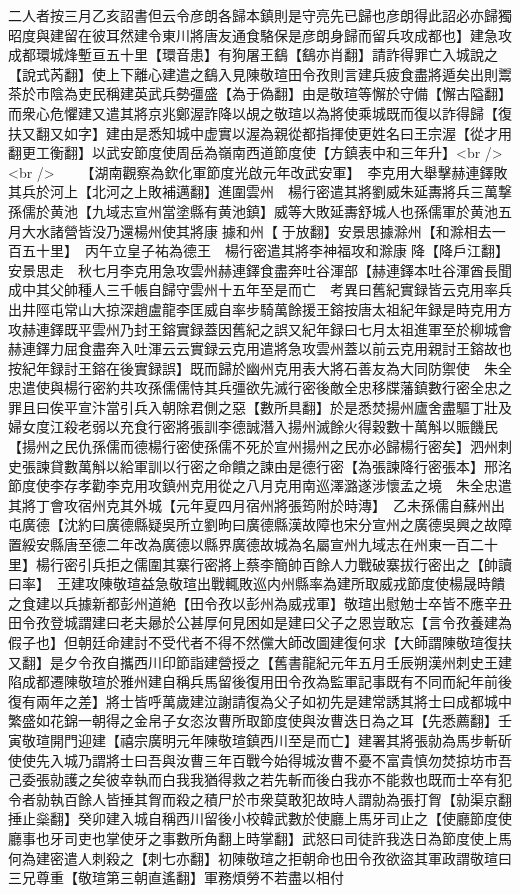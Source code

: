 二人者按三月乙亥詔書但云令彦朗各歸本鎮則是守亮先已歸也彦朗得此詔必亦歸獨昭度與建留在彼耳然建令東川將唐友通食駱保是彦朗身歸而留兵攻成都也】建急攻成都環城烽塹亘五十里【環音患】有狗屠王鷂【鷂亦肖翻】請詐得罪亡入城說之【說式芮翻】使上下離心建遣之鷂入見陳敬瑄田令孜則言建兵疲食盡將遁矣出則鬻茶於市陰為吏民稱建英武兵勢彊盛【為于偽翻】由是敬瑄等懈於守備【懈古隘翻】而衆心危懼建又遣其將京兆鄭渥詐降以覘之敬瑄以為將使乘城既而復以詐得歸【復扶又翻又如字】建由是悉知城中虚實以渥為親從都指揮使更姓名曰王宗渥【從才用翻更工衡翻】以武安節度使周岳為嶺南西道節度使【方鎮表中和三年升】<br />
<br />
　　【湖南觀察為欽化軍節度光啟元年改武安軍】　李克用大舉擊赫連鐸敗其兵於河上【北河之上敗補邁翻】進圍雲州　楊行密遣其將劉威朱延夀將兵三萬撃孫儒於黄池【九域志宣州當塗縣有黄池鎮】威等大敗延夀舒城人也孫儒軍於黄池五月大水諸營皆没乃還楊州使其將康據和州【于放翻】安景思據滁州【和滁相去一百五十里】　丙午立皇子祐為德王　楊行密遣其將李神福攻和滁康降【降戶江翻】安景思走　秋七月李克用急攻雲州赫連鐸食盡奔吐谷渾部【赫連鐸本吐谷渾酋長聞成中其父帥種人三千帳自歸守雲州十五年至是而亡　考異曰舊紀實録皆云克用率兵出井陘屯常山大掠深趙盧龍李匡威自率步騎萬餘援王鎔按唐太祖紀年録是時克用方攻赫連鐸既平雲州乃封王鎔實録蓋因舊紀之誤又紀年録曰七月太祖進軍至於柳城會赫連鐸力屈食盡奔入吐渾云云實録云克用遣將急攻雲州蓋以前云克用親討王鎔故也按紀年録討王鎔在後實録誤】既而歸於幽州克用表大將石善友為大同防禦使　朱全忠遣使與楊行密約共攻孫儒儒恃其兵彊欲先滅行密後敵全忠移牒藩鎮數行密全忠之罪且曰俟平宣汴當引兵入朝除君側之惡【數所具翻】於是悉焚揚州廬舍盡驅丁壯及婦女度江殺老弱以充食行密將張訓李德誠潛入揚州滅餘火得穀數十萬斛以賑饑民【揚州之民仇孫儒而德楊行密使孫儒不死於宣州揚州之民亦必歸楊行密矣】泗州刺史張諫貸數萬斛以給軍訓以行密之命饋之諫由是德行密【為張諫降行密張本】邢洺節度使李存孝勸李克用攻鎮州克用從之八月克用南巡澤潞遂涉懷孟之境　朱全忠遣其將丁會攻宿州克其外城【元年夏四月宿州將張筠附於時漙】　乙未孫儒自蘇州出屯廣德【沈約曰廣德縣疑吳所立劉昫曰廣德縣漢故障也宋分宣州之廣德吳興之故障置綏安縣唐至德二年改為廣德以縣界廣德故城為名屬宣州九域志在州東一百二十里】楊行密引兵拒之儒圍其寨行密將上蔡李簡帥百餘人力戰破寨拔行密出之【帥讀曰率】　王建攻陳敬瑄益急敬瑄出戰輒敗巡内州縣率為建所取威戎節度使楊晟時饋之食建以兵據新都彭州道絶【田令孜以彭州為威戎軍】敬瑄出慰勉士卒皆不應辛丑田令孜登城謂建曰老夫曏於公甚厚何見困如是建曰父子之恩豈敢忘【言令孜養建為假子也】但朝廷命建討不受代者不得不然儻大師改圖建復何求【大師謂陳敬瑄復扶又翻】是夕令孜自攜西川印節詣建營授之【舊書龍紀元年五月壬辰朔漢州刺史王建陷成都遷陳敬瑄於雅州建自稱兵馬留後復用田令孜為監軍記事既有不同而紀年前後復有兩年之差】將士皆呼萬歲建泣謝請復為父子如初先是建常誘其將士曰成都城中繁盛如花錦一朝得之金帛子女恣汝曹所取節度使與汝曹迭日為之耳【先悉薦翻】壬寅敬瑄開門迎建【禧宗廣明元年陳敬瑄鎮西川至是而亡】建署其將張勍為馬步斬斫使使先入城乃謂將士曰吾與汝曹三年百戰今始得城汝曹不憂不富貴慎勿焚掠坊市吾己委張勍護之矣彼幸執而白我我猶得救之若先斬而後白我亦不能救也既而士卒有犯令者勍執百餘人皆捶其胷而殺之積尸於市衆莫敢犯故時人謂勍為張打胷【勍渠京翻捶止橤翻】癸卯建入城自稱西川留後小校韓武數於使廳上馬牙司止之【使廳節度使廳事也牙司吏也掌使牙之事數所角翻上時掌翻】武怒曰司徒許我迭日為節度使上馬何為建密遣人刺殺之【刺七亦翻】初陳敬瑄之拒朝命也田令孜欲盜其軍政謂敬瑄曰三兄尊重【敬瑄第三朝直遙翻】軍務煩勞不若盡以相付